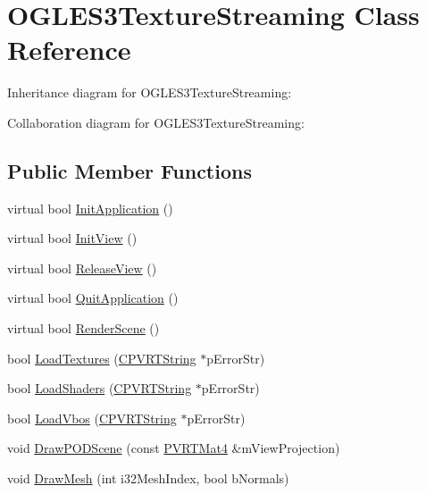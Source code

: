 \hypertarget{class_o_g_l_e_s3_texture_streaming}{\section{O\+G\+L\+E\+S3\+Texture\+Streaming Class Reference}
\label{class_o_g_l_e_s3_texture_streaming}
}


Inheritance diagram for O\+G\+L\+E\+S3\+Texture\+Streaming\+:


Collaboration diagram for O\+G\+L\+E\+S3\+Texture\+Streaming\+:
\subsection*{Public Member Functions}
\begin{DoxyCompactItemize}
\item 
virtual bool \hyperlink{class_o_g_l_e_s3_texture_streaming_acbbad14f315059c6af2ddcd6f289c6f2}{Init\+Application} ()
\item 
virtual bool \hyperlink{class_o_g_l_e_s3_texture_streaming_a1c3d005b0c26275e79edad3e6be7ad77}{Init\+View} ()
\item 
virtual bool \hyperlink{class_o_g_l_e_s3_texture_streaming_ad4bc0b9852a345aeeeae5ab31019d932}{Release\+View} ()
\item 
virtual bool \hyperlink{class_o_g_l_e_s3_texture_streaming_a978ba872db7be8af5c46629919946ae0}{Quit\+Application} ()
\item 
virtual bool \hyperlink{class_o_g_l_e_s3_texture_streaming_a8ceea3c9b7b714c3bc7fb30b267c3aed}{Render\+Scene} ()
\item 
bool \hyperlink{class_o_g_l_e_s3_texture_streaming_a8fd16e152424c5eed5772cee683498a7}{Load\+Textures} (\hyperlink{class_c_p_v_r_t_string}{C\+P\+V\+R\+T\+String} $\ast$p\+Error\+Str)
\item 
bool \hyperlink{class_o_g_l_e_s3_texture_streaming_a79d21fb9bdac2ec54fbe9b9c33eb9cb4}{Load\+Shaders} (\hyperlink{class_c_p_v_r_t_string}{C\+P\+V\+R\+T\+String} $\ast$p\+Error\+Str)
\item 
bool \hyperlink{class_o_g_l_e_s3_texture_streaming_afe11b9f96cfe74ecba95ca44db12ccae}{Load\+Vbos} (\hyperlink{class_c_p_v_r_t_string}{C\+P\+V\+R\+T\+String} $\ast$p\+Error\+Str)
\item 
void \hyperlink{class_o_g_l_e_s3_texture_streaming_abec4d091d8706a3698d8a7570cc821e1}{Draw\+P\+O\+D\+Scene} (const \hyperlink{struct_p_v_r_t_mat4}{P\+V\+R\+T\+Mat4} \&m\+View\+Projection)
\item 
void \hyperlink{class_o_g_l_e_s3_texture_streaming_af719c8fa71bb05c78da47139a5e95bc8}{Draw\+Mesh} (int i32\+Mesh\+Index, bool b\+Normals)
\end{DoxyCompactItemize}



